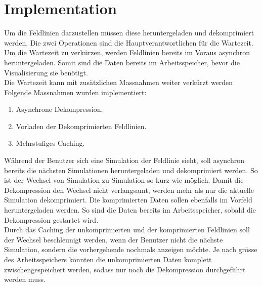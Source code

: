 \section{Implementation}
Um die Feldlinien darzustellen müssen diese heruntergeladen und dekomprimiert werden. Die zwei Operationen sind die Hauptverantwortlichen für die Wartezeit. Um die Wartezeit zu verkürzen, werden Feldlinien bereits im Voraus asynchron heruntergeladen. Somit sind die Daten bereits im Arbeitsspeicher, bevor die Visualisierung sie benötigt.\\
Die Wartezeit kann mit zusätzlichen Massnahmen weiter verkürzt werden Folgende Massnahmen wurden implementiert:
\begin{enumerate}
	\item Asynchrone Dekompression.
	\item Vorladen der Dekomprimierten Feldlinien.
	\item Mehrstufiges Caching.
\end{enumerate}
Während der Benutzer sich eine Simulation der Feldlinie sieht, soll asynchron bereits die nächsten Simulationen heruntergeladen und dekomprimiert werden. So ist der Wechsel von Simulation zu Simulation so kurz wie möglich. Damit die Dekompression den Wechsel nicht verlangsamt, werden mehr als nur die aktuelle Simulation dekomprimiert. Die komprimierten Daten sollen ebenfalls im Vorfeld heruntergeladen werden. So sind die Daten bereits im Arbeitsspeicher, sobald die Dekompression gestartet wird.\\
Durch das Caching der unkomprimierten und der komprimierten Feldlinien soll der Wechsel beschleunigt werden, wenn der Benutzer nicht die nächste Simulation, sondern die vorhergehende nochmals anzeigen möchte. Je nach grösse des Arbeitsspeichers könnten die unkomprimierten Daten komplett zwischengespeichert werden, sodass nur noch die Dekompression durchgeführt werden muss.\\

